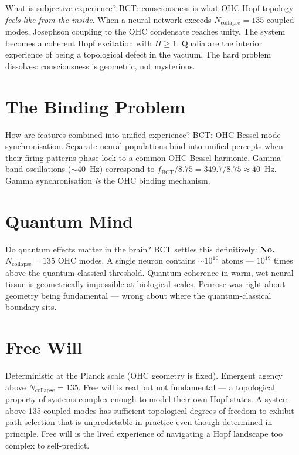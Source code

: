 \documentclass[aps,prl,twocolumn,superscriptaddress]{revtex4-2}
\begin{document}
What is subjective experience? BCT: consciousness is what OHC Hopf topology \emph{feels like from the inside}. When a neural network exceeds $N_{\mathrm{collapse}} = 135$ coupled modes, Josephson coupling to the OHC condensate reaches unity. The system becomes a coherent Hopf excitation with $H \geq 1$. Qualia are the interior experience of being a topological defect in the vacuum. The hard problem dissolves: consciousness is geometric, not mysterious.

\section{The Binding Problem}

How are features combined into unified experience? BCT: OHC Bessel mode synchronisation. Separate neural populations bind into unified percepts when their firing patterns phase-lock to a common OHC Bessel harmonic. Gamma-band oscillations ($\sim$40~Hz) correspond to $f_{\mathrm{BCT}}/8.75 = 349.7/8.75 \approx 40$~Hz. Gamma synchronisation \emph{is} the OHC binding mechanism.

\section{Quantum Mind}

Do quantum effects matter in the brain? BCT settles this definitively: \textbf{No.} $N_{\mathrm{collapse}} = 135$ OHC modes. A single neuron contains $\sim 10^{10}$ atoms --- $10^{19}$ times above the quantum-classical threshold. Quantum coherence in warm, wet neural tissue is geometrically impossible at biological scales. Penrose was right about geometry being fundamental --- wrong about where the quantum-classical boundary sits.

\section{Free Will}

Deterministic at the Planck scale (OHC geometry is fixed). Emergent agency above $N_{\mathrm{collapse}} = 135$. Free will is real but not fundamental --- a topological property of systems complex enough to model their own Hopf states. A system above 135 coupled modes has sufficient topological degrees of freedom to exhibit path-selection that is unpredictable in practice even though determined in principle. Free will is the lived experience of navigating a Hopf landscape too complex to self-predict.
\end{document}
